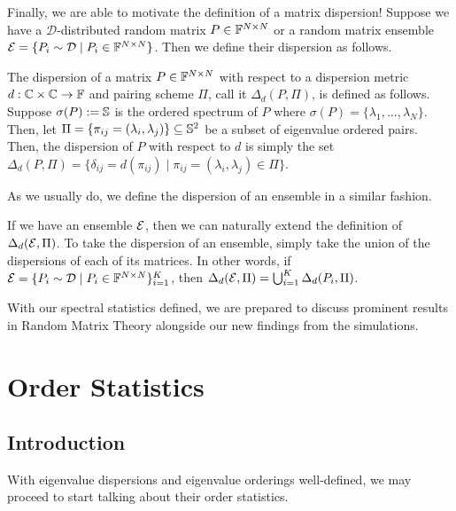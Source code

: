 Finally, we are able to motivate the definition of a matrix dispersion! Suppose we have a $\mathcal{D}$-distributed random matrix $P \in \F^{N \times N}$ or a random matrix ensemble $\Ens = \{P_i \sim \mathcal{D} \mid P_i \in \F^{N \times N}\}$. Then we define their dispersion as follows. 

\begin{definition}[Dispersion]
The dispersion of a matrix $P \in \F^{N \times N}$ with respect to a dispersion metric $d: \Cc \times \Cc \to \F$ and pairing scheme $\Pi$, call it $\Delta_d(P, \Pi)$, is defined as follows. Suppose $\sigma(P) := \S$ is the ordered spectrum of $P$ where $\sigma(P) = \{\lambda_1, \dots, \lambda_N\}$. Then, let $\Pi = \{\pi_{ij} = (\lambda_i,\lambda_j) \} \subseteq \S^2$ be a subset of eigenvalue ordered pairs. Then, the dispersion of $P$ with respect to $d$ is simply the set $\Delta_d(P, \Pi)=\{\delta_{ij} = d(\pi_{ij}) \mid \pi_{ij} = (\lambda_i,\lambda_j) \in \Pi\}$.
\end{definition}

As we usually do, we define the dispersion of an ensemble in a similar fashion. 

\begin{definition}
If we have an ensemble $\Ens$, then we can naturally extend the definition of $\Delta_d(\Ens, \Pi)$. To take the dispersion of an ensemble, simply take the union of the dispersions of each of its matrices. In other words, if $\Ens = \{P_i \sim \mathcal{D} \mid P_i \in \F^{N \times N}\}_{i = 1}^K$, then $\Delta_d(\Ens, \Pi) = \bigcup_{i=1}^K \Delta_d(P_i, \Pi)$.
\end{definition}

With our spectral statistics defined, we are prepared to discuss prominent results in Random Matrix Theory alongside our new findings from the simulations. 


\section{Order Statistics}
\subsection{Introduction}
With eigenvalue dispersions and eigenvalue orderings well-defined, we may proceed to start talking about their order statistics. 

